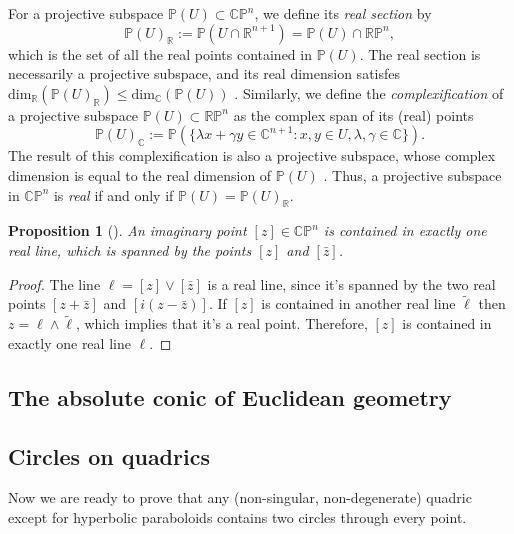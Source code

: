 \documentclass[10pt, a4paper]{article}
\theoremstyle{BoldTopSpacing}
\theoremstyle{BoldTopSpacing}
\theoremstyle{BoldTopSpacing}
\theoremstyle{BoldTopBottomSpacing}
\theoremstyle{BoldTopSpacing}
\newtheorem{proposition}{Proposition}[section]
\theoremstyle{BoldTopBottomSpacing}
\theoremstyle{remark}
\begin{document}
For a projective subspace $\mathbb{P}(U) \subset \mathbb{C}\mathbb{P}^n$, we define its \textit{real section} by
\[
    \mathbb{P}(U)_{\mathbb{R}} := \mathbb{P}(U \cap \mathbb{R}^{n+1}) = \mathbb{P}(U) \cap \mathbb{R}\mathbb{P}^n,
\]
which is the set of all the real points contained in $\mathbb{P}(U)$. The real section is necessarily a projective subspace, and its real dimension satisfes  $\text{dim}_{\mathbb{R}}\left(\mathbb{P}(U)_{\mathbb{R}}\right) \leq \text{dim}_{\mathbb{C}}\left(\mathbb{P}(U)\right)$ \cite{geometryII}.
Similarly, we define the \textit{complexification} of a projective subspace $\mathbb{P}(U) \subset \mathbb{R}\mathbb{P}^n$ as the complex span of its (real) points
\[
    \mathbb{P}(U)_{\mathbb{C}} := \mathbb{P}(\{ \lambda x + \gamma y \in \mathbb{C}^{n+1} : x, y \in U, \lambda, \gamma \in \mathbb{C} \}).
\]
The result of this complexification is also a projective subspace, whose complex dimension is equal to the real dimension of $\mathbb{P}(U)$ \cite{geometryII}. Thus, a projective subspace in $\mathbb{C}\mathbb{P}^n$ is \textit{real} if and only if $\mathbb{P}(U) = \mathbb{P}(U)_{\mathbb{R}}$. \par

\begin{proposition}[]
\label{thm:span-real-line}
An imaginary point $[z] \in \mathbb{C}\mathbb{P}^n$ is contained in exactly one real line, which is spanned by the points $[z]$ and $[\bar{z}]$.
\end{proposition}

\begin{proof}
The line $\ell = [z] \vee [\bar{z}]$ is a real line, since it's spanned by the two real points $[z + \bar{z}]$ and $[i(z - \bar{z})]$. If $[z]$ is contained in another real line $\tilde{\ell}$ then $z = \ell \wedge \tilde{\ell}$, which implies that it's a real point. Therefore, $[z]$ is contained in exactly one real line $\ell$.
\end{proof}

\subsection{The absolute conic of Euclidean geometry}
\label{subsec:absolute-quadrics}

\subsection{Circles on quadrics}
\label{subsec:circles-on-quadrics}

Now we are ready to prove that any (non-singular, non-degenerate) quadric except for hyperbolic paraboloids contains two circles through every point.
\end{document}
